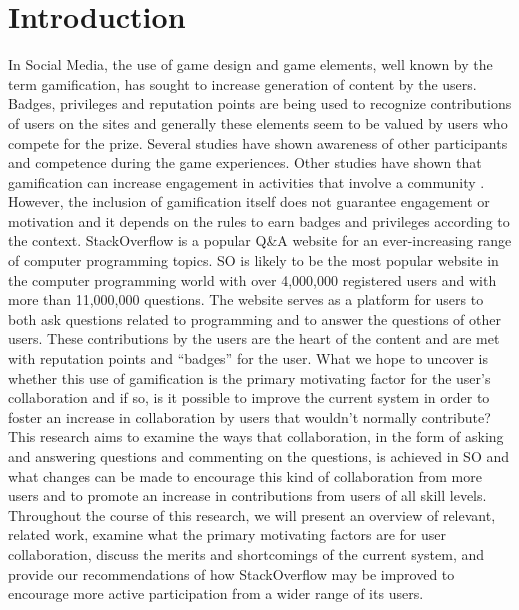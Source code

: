\documentclass{sigchi}
\begin{document}

 

\section{Introduction}
In Social Media, the use of game design and game elements, well known by the term gamification, has sought to increase generation of content by the users. Badges, privileges and reputation points are being used to recognize contributions of users on the sites and generally these elements seem to be valued by users who compete for the prize. Several studies have shown awareness of other participants and competence during the game experiences\cite{Rughinis}. Other studies have shown that gamification can increase engagement in activities that involve a community \cite{Marder}. However, the inclusion of gamification itself does not guarantee engagement or motivation and it depends on the rules to earn badges and privileges  according to the context\cite{Deterding}.
StackOverflow is a popular Q&A website for an ever-increasing range of computer programming topics. SO is likely to be the most popular website in the computer programming world with over 4,000,000 registered users and with more than 11,000,000 questions. The website serves as a platform for users to both ask questions related to programming and to answer the questions of other users. These contributions by the users are the heart of the content and are met with reputation points and “badges” for the user. What we hope to uncover is whether this use of gamification is the primary motivating factor for the user’s collaboration and if so, is it possible to improve the current system in order to foster an increase in collaboration by users that wouldn’t normally contribute?
This research aims to examine the ways that collaboration, in the form of asking and answering questions and commenting on the questions, is achieved in SO and what changes can be made to encourage this kind of collaboration from more users and to promote an increase in contributions from users of all skill levels.
Throughout the course of this research, we will present an overview of relevant, related work, examine what the primary motivating factors are for user collaboration, discuss the merits and shortcomings of the current system, and provide our recommendations of how StackOverflow may be improved to encourage more active participation from a wider range of its users.
\end{document}
